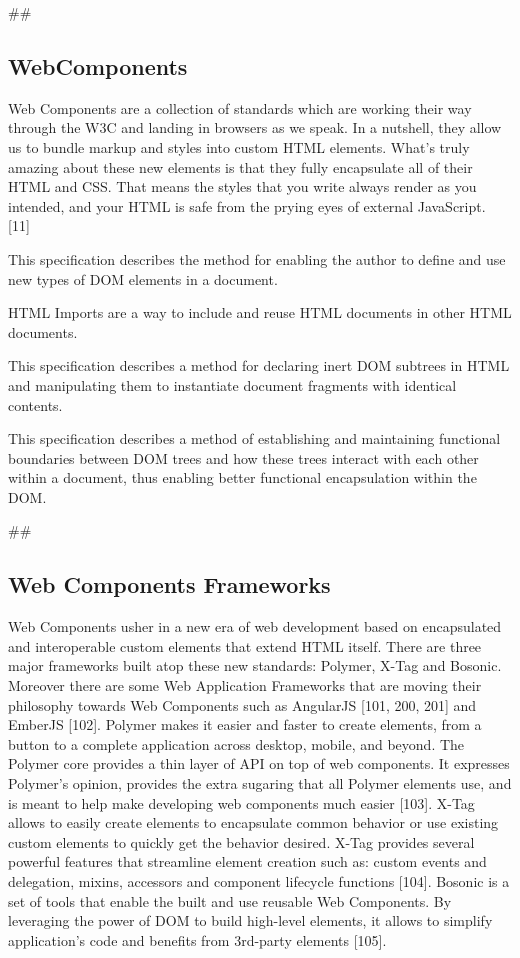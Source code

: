 \documentclass{sig-alternate}
\begin{document}
## \subsection{WebComponents}

Web Components are a collection of standards which are working their way through the W3C and landing in browsers as we speak. In a nutshell, they allow us to bundle markup and styles into custom HTML elements. What's truly amazing about these new elements is that they fully encapsulate all of their HTML and CSS. That means the styles that you write always render as you intended, and your HTML is safe from the prying eyes of external JavaScript. [11]

\begin{description}
\itemsep1pt\parskip0pt
  \item[Custom Elements] This specification describes the method for enabling the author to define and use new types of DOM elements in a document.
  \item[HTML Imports] HTML Imports are a way to include and reuse HTML documents in other HTML documents.
  \item[Templates] This specification describes a method for declaring inert DOM subtrees in HTML and manipulating them to instantiate document fragments with identical contents.
  \item[Shadow DOM] This specification describes a method of establishing and maintaining functional boundaries between DOM trees and how these trees interact with each other within a document, thus enabling better functional encapsulation within the DOM.
\end{description}

## \subsection{Web Components Frameworks}

Web Components usher in a new era of web development based on encapsulated and interoperable custom elements that extend HTML itself.
There are three major frameworks built atop these new standards: Polymer, X-Tag and Bosonic.
Moreover there are some Web Application Frameworks that are moving their philosophy towards Web Components such as AngularJS [101, 200, 201] and EmberJS [102].
Polymer makes it easier and faster to create elements, from a button to a complete application across desktop, mobile, and beyond. The Polymer core provides a thin layer of API on top of web components. It expresses Polymer's opinion, provides the extra sugaring that all Polymer elements use, and is meant to help make developing web components much easier [103].
X-Tag allows to easily create elements to encapsulate common behavior or use existing custom elements to quickly get the behavior desired. X-Tag provides several powerful features that streamline element creation such as: custom events and delegation, mixins, accessors and component lifecycle functions [104].
Bosonic is a set of tools that enable the built and use reusable Web Components. By leveraging the power of DOM to build high-level elements, it allows to simplify application's code and benefits from 3rd-party elements [105].
\end{document}
